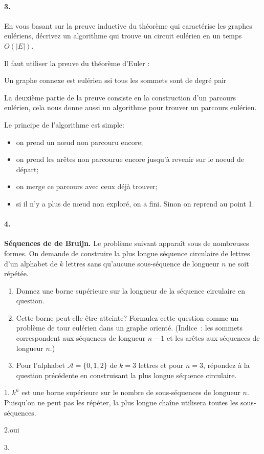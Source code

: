 \paragraph{3. } En vous basant sur la preuve inductive du théorème qui caractérise les graphes eulériens, décrivez un algorithme qui trouve un circuit eulérien en un temps $O(|E|)$.
\begin{solution}
Il faut utiliser la preuve du théorème d'Euler :

\begin{center}
Un graphe connexe est eulérien ssi tous les sommets sont de degré
pair
\par\end{center}

La deuxième partie de la preuve consiste en la construction d'un parcours
eulérien, cela nous donne aussi un algorithme pour trouver un parcours
eulérien.

Le principe de l’algorithme est simple:
\begin{itemize}
\item on prend un nœud non parcouru encore;
\item on prend les arêtes non parcourue encore jusqu'à revenir sur le noeud de départ;
\item on merge ce parcours avec ceux déjà trouver;
\item si il n'y a plus de nœud non exploré, on a fini. Sinon on reprend au point 1.
\end{itemize}
\end{solution}
\paragraph{4. } \textbf{Séquences de de Bruijn.} Le problème suivant apparaît sous de nombreuses formes. On demande de construire la plus longue séquence circulaire de lettres d'un alphabet de $k$ lettres sans qu'aucune sous-séquence de longueur $n$ ne soit répétée.
\begin{enumerate}
  \item Donnez une borne supérieure sur la longueur de la séquence circulaire en question.
  \item Cette borne peut-elle être atteinte? Formulez cette question comme un problème de tour eulérien dans un graphe orienté. (Indice~: les sommets correspondent aux séquences de longueur $n-1$ et les arêtes aux séquences de longueur $n$.)
  \item Pour l'alphabet $\mathcal{A} = \{0, 1, 2\}$ de $k = 3$ lettres et pour $n = 3$, répondez à la question précédente en construisant la plus longue séquence circulaire.
\end{enumerate}
\begin{solution}
1. $k^{n}$ est une borne supérieure sur le nombre de sous-séquences
de longueur $n$. Puisqu'on ne peut pas les répéter, la plus longue
chaîne utilisera toutes les sous-séquences.

2.oui

3.
\end{solution}
\pagebreak

